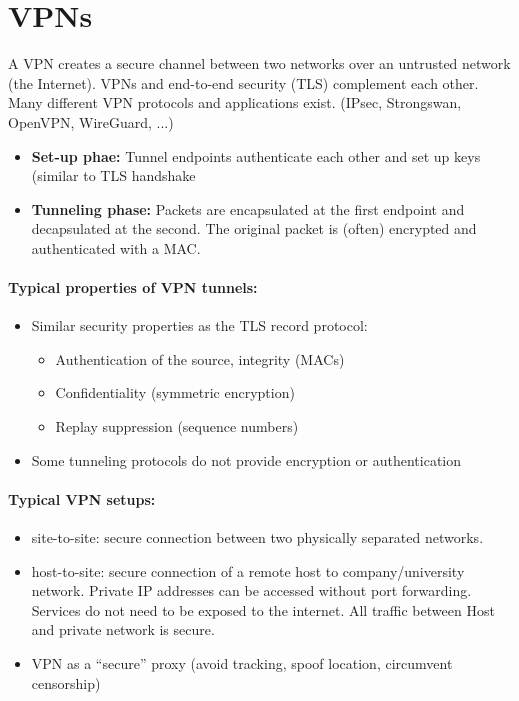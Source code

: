 \section{VPNs}

A VPN creates a secure channel between two networks over an untrusted network (the Internet). VPNs and end-to-end security (TLS) complement each other. Many different VPN protocols and applications exist.
(IPsec, Strongswan, OpenVPN, WireGuard, ...)
\begin{itemize}
    \item \textbf{Set-up phae:} Tunnel endpoints authenticate each other and set up keys (similar to TLS handshake
    \item \textbf{Tunneling phase:} Packets are encapsulated at the first endpoint and decapsulated at the second. The original packet is (often) encrypted and authenticated with a MAC.
\end{itemize}

\paragraph{Typical properties of VPN tunnels:}
\begin{itemize}
	\item Similar security properties as the TLS record protocol:
	\begin{itemize}
		\item Authentication of the source, integrity (MACs)
		\item Confidentiality (symmetric encryption)
		\item Replay suppression (sequence numbers)
	\end{itemize}
	\item Some tunneling protocols do not provide encryption or authentication
\end{itemize}

\paragraph{Typical VPN setups:}
\begin{itemize}
	\item site-to-site: secure connection between two physically separated networks.  
	\item host-to-site: secure connection of a remote host to company/university network. Private IP addresses can be accessed without port forwarding. Services do not need to be exposed to the internet. All traffic between Host and private network is secure.
	\item VPN as a “secure” proxy (avoid tracking, spoof location, circumvent censorship)
\end{itemize}

